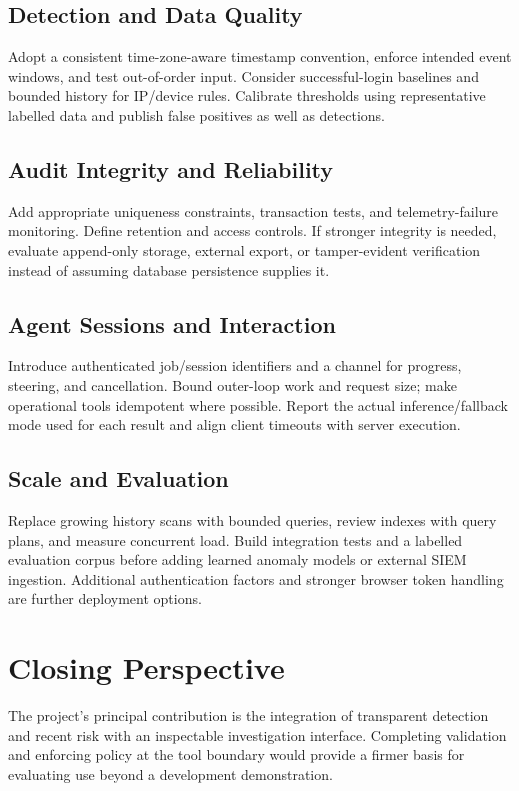 \subsection{Detection and Data Quality}
Adopt a consistent time-zone-aware timestamp convention, enforce intended event windows, and test out-of-order input. Consider successful-login baselines and bounded history for IP/device rules. Calibrate thresholds using representative labelled data and publish false positives as well as detections.

\subsection{Audit Integrity and Reliability}
Add appropriate uniqueness constraints, transaction tests, and telemetry-failure monitoring. Define retention and access controls. If stronger integrity is needed, evaluate append-only storage, external export, or tamper-evident verification instead of assuming database persistence supplies it.

\subsection{Agent Sessions and Interaction}
Introduce authenticated job/session identifiers and a channel for progress, steering, and cancellation. Bound outer-loop work and request size; make operational tools idempotent where possible. Report the actual inference/fallback mode used for each result and align client timeouts with server execution.

\subsection{Scale and Evaluation}
Replace growing history scans with bounded queries, review indexes with query plans, and measure concurrent load. Build integration tests and a labelled evaluation corpus before adding learned anomaly models or external SIEM ingestion. Additional authentication factors and stronger browser token handling are further deployment options.

\section{Closing Perspective}
The project's principal contribution is the integration of transparent detection and recent risk with an inspectable investigation interface. Completing validation and enforcing policy at the tool boundary would provide a firmer basis for evaluating use beyond a development demonstration.
